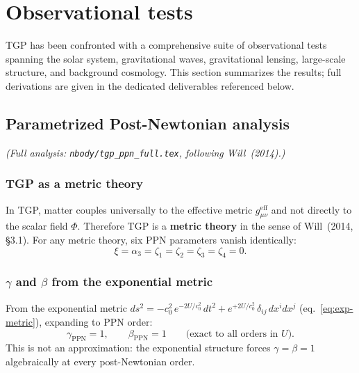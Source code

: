 
\section{Observational tests}\label{sec:tests}

TGP has been confronted with a comprehensive suite of observational
tests spanning the solar system, gravitational waves, gravitational
lensing, large-scale structure, and background cosmology.  This
section summarizes the results; full derivations are given in the
dedicated deliverables referenced below.

\subsection{Parametrized Post-Newtonian analysis}%
\label{ssec:ppn-summary}

\noindent\textit{(Full analysis: \texttt{nbody/tgp\_ppn\_full.tex},
following Will~(2014).)}

\subsubsection{TGP as a metric theory}

In TGP, matter couples universally to the effective metric
$g_{\mu\nu}^{\mathrm{eff}}$ and not directly to the scalar field
$\Phi$.  Therefore TGP is a \textbf{metric theory} in the sense
of Will~(2014, \S3.1).  For any metric theory, six PPN parameters
vanish identically:
\begin{equation}\label{eq:metric-theory-vanish}
  \xi = \alpha_{3} = \zeta_{1} = \zeta_{2} = \zeta_{3} = \zeta_{4} = 0.
\end{equation}

\subsubsection{$\gamma$ and $\beta$ from the exponential metric}

From the exponential metric
$ds^{2}=-c_{0}^{2}\,e^{-2U/c_{0}^{2}}\,dt^{2}
+e^{+2U/c_{0}^{2}}\,\delta_{ij}\,dx^{i}dx^{j}$
(eq.~\ref{eq:exp-metric}), expanding to PPN order:
\begin{equation}\label{eq:gamma-beta-ppn}
  \boxed{
    \gamma_{\mathrm{PPN}} = 1,
    \qquad
    \beta_{\mathrm{PPN}} = 1
  }
  \qquad\text{(exact to all orders in $U$)}.
\end{equation}
This is not an approximation: the exponential structure forces
$\gamma=\beta=1$ algebraically at every post-Newtonian order.

